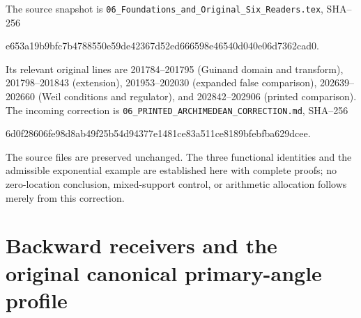 \documentclass[11pt,a4paper]{article}
\providecommand{\Tr}{\operatorname{Tr}}
\providecommand{\dd}{\,d}
\begin{document}
The source snapshot is
\texttt{06\_Foundations\_and\_Original\_Six\_Readers.tex}, SHA--256
\begin{center}\small\ttfamily
e653a19b9bfc7b4788550e59de42367d52ed666598e46540d040e06d7362cad0.
\end{center}
Its relevant original lines are 201784--201795 (Guinand domain and
transform), 201798--201843 (extension), 201953--202030 (expanded false
comparison), 202639--202660 (Weil conditions and regulator), and
202842--202906 (printed comparison).  The incoming correction is
\texttt{06\_PRINTED\_ARCHIMEDEAN\_CORRECTION.md}, SHA--256
\begin{center}\small\ttfamily
6d0f28606fe98d8ab49f25b54d94377e1481ce83a511ce8189bfebfba629dcee.
\end{center}
The source files are preserved unchanged.  The three functional identities
and the admissible exponential example are established here with complete
proofs; no zero-location conclusion, mixed-support control, or arithmetic
allocation follows merely from this correction.



\endgroup

\clearpage
\begingroup
\def\C{\mathbb C}
\def\Tr{\operatorname{Tr}}
\def\dd{\,d}
\def\im{\operatorname{im}}

\setcounter{equation}{0}
\renewcommand{\theequation}{A03ARU.\arabic{equation}}
\section*{Backward receivers and the original canonical primary-angle profile}
\end{document}
